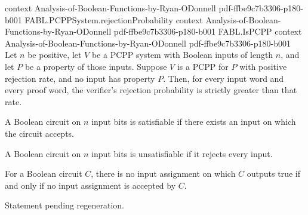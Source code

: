 \begin{theorem}
  {context}
  {Analysis-of-Boolean-Functions-by-Ryan-ODonnell}
  {pdf-ffbe9c7b3306-p180-b001}
\proofstep
  {FABL.PCPPSystem.rejectionProbability}
  {context}
  {Analysis-of-Boolean-Functions-by-Ryan-ODonnell}
  {pdf-ffbe9c7b3306-p180-b001}
\proofstep
  {FABL.IsPCPP}
  {context}
  {Analysis-of-Boolean-Functions-by-Ryan-ODonnell}
  {pdf-ffbe9c7b3306-p180-b001}
Let $n$ be positive, let $V$ be a PCPP system with Boolean inputs of length $n$, and let
$P$ be a property of those inputs. Suppose $V$ is a PCPP for $P$ with positive rejection
rate, and no input has property $P$. Then, for every input word and every proof word,
the verifier's rejection probability is strictly greater than that rate.
\end{theorem}

\begin{definition}
\label{FABL.BooleanCircuit.Satisfiable}
\leanok
{}
A Boolean circuit on $n$ input bits is satisfiable if there exists an input on which the
circuit accepts.
\end{definition}

\begin{definition}
\label{FABL.BooleanCircuit.Unsatisfiable}
\leanok
{}
A Boolean circuit on $n$ input bits is unsatisfiable if it rejects every input.
\end{definition}

\begin{theorem}
\label{FABL.BooleanCircuit.not_satisfiable_iff_unsatisfiable}
\leanok
{}
For a Boolean circuit $C$, there is no input assignment on which $C$ outputs true if and
only if no input assignment is accepted by $C$.
\end{theorem}

\begin{theorem}
\label{FABL.PCPPDescription.optimumAcceptance_eq_one_of_satisfiable}
\leanok
{}
Statement pending regeneration.
\end{theorem}

